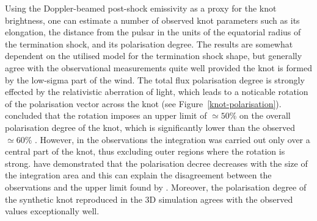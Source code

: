 Using the Doppler-beamed post-shock emissivity as a proxy for the knot brightness, one can estimate a number of observed  knot parameters such as its elongation, the distance from the pulsar in the units of the equatorial radius of the termination shock, and its polarisation degree.     The results are somewhat dependent on the  utilised model for the termination shock shape, but generally agree with the observational measurements quite well provided the knot is formed by the low-sigma part of the wind.  
The total flux polarisation degree is strongly effected by the relativistic aberration of light, which leads to a noticable rotation of the polarisation vector across the knot (see Figure~\ref{knot-polarisation}).  \citet{YB-15} concluded that the rotation imposes an upper limit 
of $\simeq 50\%$ on the overall polarisation degree of the knot, which is significantly lower than the observed $\simeq 60\%$ .  However, in the observations the integration was carried out only over a central part of the knot, thus excluding outer regions where the rotation is strong. \citet{LKP-16} have demonstrated that the polarisation decree decreases with the size of the integration area and this can explain the disagreement  between the observations and the upper limit found by \citet{YB-15}.      
Moreover, the polarisation degree of the synthetic knot reproduced in the 3D simulation \citep{porth-14} agrees with the observed values exceptionally well. 